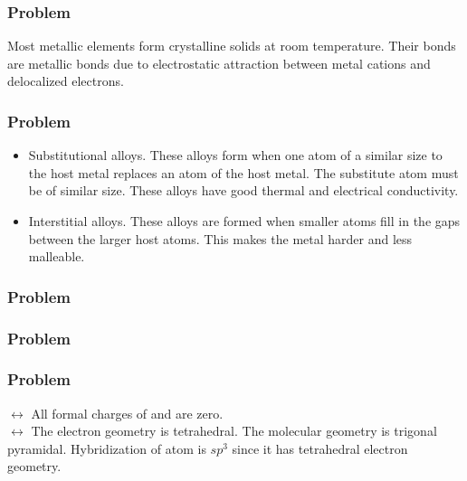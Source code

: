 \documentclass{article}
\begin{document}
\subsubsection*{Problem \countThis}
Most metallic elements form crystalline solids at room temperature. Their bonds are metallic bonds due to electrostatic attraction between metal cations and delocalized electrons. 
\subsubsection*{Problem \countThis}
\begin{itemize}
    \item Substitutional alloys. These alloys form when one atom of a similar size to the host metal replaces an atom of the host metal. The substitute atom must be of similar size. These alloys have good thermal and electrical conductivity.
    \item Interstitial alloys. These alloys are formed when smaller atoms fill in the gaps between the larger host atoms. This makes the metal harder and less malleable. 
\end{itemize}
\subsubsection*{Problem \countThis}
\subsubsection*{Problem \countThis}
\subsubsection*{Problem \countThis}
\(\longleftrightarrow\)
\AnswerSet
All formal charges of  and  are zero. \\
\(\longleftrightarrow\)
\AnswerSet
The electron geometry is tetrahedral. The molecular geometry is trigonal pyramidal. Hybridization of  atom is \(sp^3\) since it has tetrahedral electron geometry.
\end{document}
